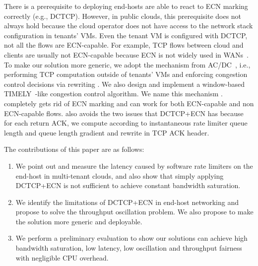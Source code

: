 There is a prerequisite to deploying \nameone \textemdash\xspace end-hosts are able to react to ECN marking correctly 
(e.g., DCTCP). However, in public clouds, this prerequisite does not always hold 
because the cloud operator does not have access to the network stack configuration in tenants' VMs. 
Even the tenant VM is configured with DCTCP, not all the flows are ECN-capable. For example,
TCP flows between cloud and clients are usually not ECN-capable because ECN is not widely used in WANs~\cite{kuhlewind2013state}.
To make our solution more generic, we adopt the mechanism from AC/DC~\cite{he2016ac}, 
i.e., performing TCP \cwnd computation outside of tenants' VMs and enforcing congestion control decisions via 
rewriting \rwnd. We also design and implement a window-based TIMELY~\cite{mittal2015timely}-like congestion control algorithm. 
We name this mechanism \nametwo. \nametwo completely gets rid of ECN marking and can work for 
both ECN-capable and non ECN-capable flows. 
\nametwo also avoids the two issues that DCTCP+ECN has because for each return ACK, 
we compute \cwnd according to instantaneous rate limiter queue length and queue length gradient and 
rewrite \rwnd in TCP ACK header. 

The contributions of this paper are as follows:
\begin{enumerate}
\item We point out and measure the latency caused by software rate limiters on the end-host in multi-tenant clouds, 
and also show that simply applying DCTCP+ECN is not sufficient to achieve constant bandwidth saturation.

\item We identify the limitations of DCTCP+ECN in end-host networking and 
propose \nameone to solve the throughput oscillation problem.
We also propose \nametwo to make the solution more generic and deployable.

\item We perform a preliminary evaluation to show our solutions can achieve high bandwidth saturation, 
low latency, low oscillation and throughput fairness with negligible CPU overhead.

\iffalse
\item We measure the performance (latency and packet loss) of software rate limiters. We show that software rate limiters can greatly increase end-to-end latency for multi-tenant cloud networks. 
We also show that simply extending ECN in software rate limiter queues and enabling DCTCP on the end-points (i.e., VMs or Container) give sub-optimal performance. 

\item We propose two techniques (\nameone and \nametwo) to enable high throughput, low oscillation, low latency and generic software rate limiters for multi-tenant cloud networks.

\item We evaluate the performance of \nameone and \nametwo. The experiment results demonstrate that the proposed solutions achieve our design goals.
\fi
\end{enumerate}

